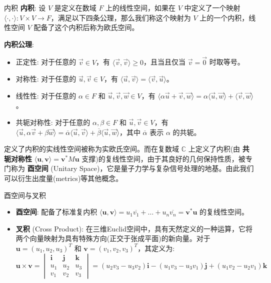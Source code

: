 \documentclass[a4paper,12pt]{ctexart}
\begin{document}
    \begin{mydef}{内积}{}
    \textbf{内积}: 设 $V$ 是定义在数域 $F$ 上的线性空间，如果在 $V$ 中定义了一个映射 $\langle \cdot , \cdot \rangle: V \times V \to F$，满足以下四条公理，那么我们称这个映射为 $V$ 上的一个内积，线性空间 $V$ 配备了这个内积后称为欧氏空间。
    
    \textbf{内积公理}:
    \begin{itemize}
        \item 正定性: 对于任意的 $\vec{v} \in V$，有 $\langle \vec{v}, \vec{v} \rangle \geq 0$，且当且仅当 $\vec{v} = \vec{0}$ 时取等号。
        \item 对称性: 对于任意的 $\vec{u}, \vec{v} \in V$，有 $\langle \vec{u}, \vec{v} \rangle = \langle \vec{v}, \vec{u} \rangle$。
        \item 线性性: 对于任意的 $\alpha \in F$ 和 $\vec{u}, \vec{v}, \vec{w} \in V$，有 $\langle \alpha \vec{u} + \vec{v}, \vec{w} \rangle = \alpha \langle \vec{u}, \vec{w} \rangle + \langle \vec{v}, \vec{w} \rangle$。
        \item 共轭对称性: 对于任意的 $\alpha, \beta \in F$ 和 $\vec{u}, \vec{v} \in V$，有 $\langle \vec{u}, \alpha \vec{v} + \beta \vec{w} \rangle = \overline{\alpha} \langle \vec{u}, \vec{v} \rangle + \overline{\beta} \langle \vec{u}, \vec{w} \rangle$，其中 $\overline{\alpha}$ 表示 $\alpha$ 的共轭。
    \end{itemize}
    \end{mydef}
    
    定义了内积的实线性空间被称为实欧氏空间。而在复数域 $\mathbb{C}$ 上定义了内积(由 \textbf{共轭对称性} $\langle \mathbf{u}, \mathbf{v} \rangle = \mathbf{v}^* M \mathbf{u}$ 支撑)的复线性空间，由于其良好的几何保持性质，被专门称为 \textbf{酉空间} (Unitary Space)，它是量子力学与复杂信号处理的地基。由此我们可以衍生出度量(metrics)等其他概念。

    \begin{mydef}{酉空间与叉积}{}
    \begin{itemize}
        \item \textbf{酉空间}: 配备了标准复内积 $\langle \mathbf{u}, \mathbf{v} \rangle = u_1 \overline{v_1} + \dots + u_n \overline{v_n} = \mathbf{v}^* \mathbf{u}$ 的复线性空间。
        \item \textbf{叉积} (Cross Product): 在三维Euclid空间中，具有天然定义的一种运算，它将两个向量映射为具有特殊方向(正交于张成平面)的新向量。对于 $\mathbf{u} = (u_1, u_2, u_3)^T$ 和 $\mathbf{v} = (v_1, v_2, v_3)^T$，其定义为:
        \[
        \mathbf{u} \times \mathbf{v} = \begin{vmatrix}
        \mathbf{i} & \mathbf{j} & \mathbf{k} \\
        u_1 & u_2 & u_3 \\
        v_1 & v_2 & v_3
        \end{vmatrix} = (u_2 v_3 - u_3 v_2) \mathbf{i} - (u_1 v_3 - u_3 v_1) \mathbf{j} + (u_1 v_2 - u_2 v_1) \mathbf{k}
        \]
    \end{itemize}
    \end{mydef}
\end{document}
